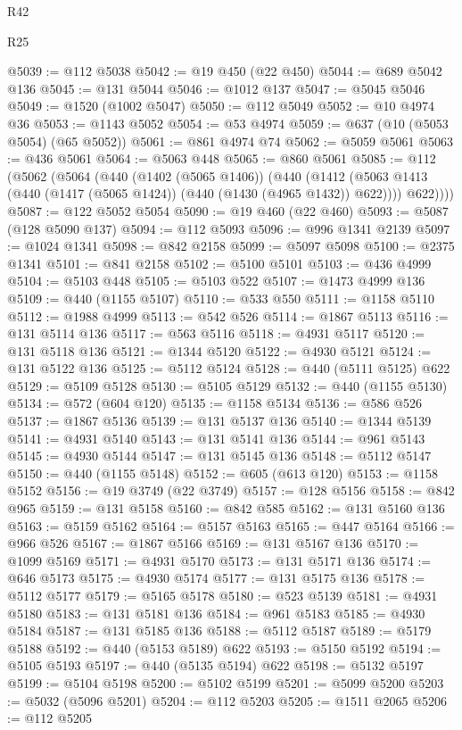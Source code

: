 \begin{lexlean}{R42}
\begin{lexlean}{R25}
\begin{coremodule}
{{{{{{{{{{{{{{{{{{{{{{{{{{{{{{{{{{{{{{{{{{{{{{{{{{{{{{{{{{{{{{{{{{{{{{{{{{{{{{{{{{{{{{{{{{{{{{{{{{{{{{{{{{{{{{{{{{{{{{{{{{{{{{{{{{{{{{{{{{{{{{{{{{{{{{{{{{{{{{{{{{{{{{{{{{{{{{{{{{{{{{{{{{{{{{{{{{{{{{{@5039 := @112 @5038
@5042 := @19 @450 (@22 @450)
@5044 := @689 @5042 @136
@5045 := @131 @5044
@5046 := @1012 @137
@5047 := @5045 @5046
@5049 := @1520 (@1002 @5047)
@5050 := @112 @5049
@5052 := @10 @4974 @36
@5053 := @1143 @5052
@5054 := @53 @4974
@5059 := @637 (@10 (@5053 @5054) (@65 @5052))
@5061 := @861 @4974 @74
@5062 := @5059 @5061
@5063 := @436 @5061
@5064 := @5063 @448
@5065 := @860 @5061
@5085 := @112
    (@5062
      (@5064
        (@440
          (@1402 (@5065 @1406))
          (@440
            (@1412 (@5063 @1413 (@440 (@1417 (@5065 @1424)) (@440 (@1430 (@4965 @1432)) @622))))
            @622))))
@5087 := @122 @5052 @5054
@5090 := @19 @460 (@22 @460)
@5093 := @5087 (@128 @5090 @137)
@5094 := @112 @5093
@5096 := @996 @1341 @2139
@5097 := @1024 @1341
@5098 := @842 @2158
@5099 := @5097 @5098
@5100 := @2375 @1341
@5101 := @841 @2158
@5102 := @5100 @5101
@5103 := @436 @4999
@5104 := @5103 @448
@5105 := @5103 @522
@5107 := @1473 @4999 @136
@5109 := @440 (@1155 @5107)
@5110 := @533 @550
@5111 := @1158 @5110
@5112 := @1988 @4999
@5113 := @542 @526
@5114 := @1867 @5113
@5116 := @131 @5114 @136
@5117 := @563 @5116
@5118 := @4931 @5117
@5120 := @131 @5118 @136
@5121 := @1344 @5120
@5122 := @4930 @5121
@5124 := @131 @5122 @136
@5125 := @5112 @5124
@5128 := @440 (@5111 @5125) @622
@5129 := @5109 @5128
@5130 := @5105 @5129
@5132 := @440 (@1155 @5130)
@5134 := @572 (@604 @120)
@5135 := @1158 @5134
@5136 := @586 @526
@5137 := @1867 @5136
@5139 := @131 @5137 @136
@5140 := @1344 @5139
@5141 := @4931 @5140
@5143 := @131 @5141 @136
@5144 := @961 @5143
@5145 := @4930 @5144
@5147 := @131 @5145 @136
@5148 := @5112 @5147
@5150 := @440 (@1155 @5148)
@5152 := @605 (@613 @120)
@5153 := @1158 @5152
@5156 := @19 @3749 (@22 @3749)
@5157 := @128 @5156
@5158 := @842 @965
@5159 := @131 @5158
@5160 := @842 @585
@5162 := @131 @5160 @136
@5163 := @5159 @5162
@5164 := @5157 @5163
@5165 := @447 @5164
@5166 := @966 @526
@5167 := @1867 @5166
@5169 := @131 @5167 @136
@5170 := @1099 @5169
@5171 := @4931 @5170
@5173 := @131 @5171 @136
@5174 := @646 @5173
@5175 := @4930 @5174
@5177 := @131 @5175 @136
@5178 := @5112 @5177
@5179 := @5165 @5178
@5180 := @523 @5139
@5181 := @4931 @5180
@5183 := @131 @5181 @136
@5184 := @961 @5183
@5185 := @4930 @5184
@5187 := @131 @5185 @136
@5188 := @5112 @5187
@5189 := @5179 @5188
@5192 := @440 (@5153 @5189) @622
@5193 := @5150 @5192
@5194 := @5105 @5193
@5197 := @440 (@5135 @5194) @622
@5198 := @5132 @5197
@5199 := @5104 @5198
@5200 := @5102 @5199
@5201 := @5099 @5200
@5203 := @5032 (@5096 @5201)
@5204 := @112 @5203
@5205 := @1511 @2065
@5206 := @112 @5205
}}}}}}}}}}}}}}}}}}}}}}}}}}}}}}}}}}}}}}}}}}}}}}}}}}}}}}}}}}}}}}}}}}}}}}}}}}}}}}}}}}}}}}}}}}}}}}}}}}}}}}}}}}}}}}}}}}}}}}}}}}}}}}}}}}}}}}}}}}}}}}}}}}}}}}}}}}}}}}}}}}}}}}}}}}}}}}}}}}}}}}}}}}}}}}}}}}}}}}}
\end{coremodule}
\end{lexlean}
\end{lexlean}
